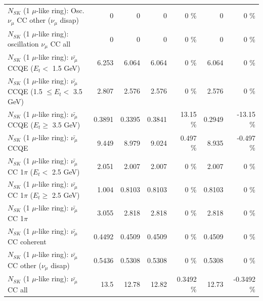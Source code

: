 \begin{table}
\begin{tabular}{| l | r | r | r  r | r  r |}
         $N_{SK}$ (1 $\mu$-like ring): Osc. $\nu_\mu$ CC other ($\nu_\mu$ disap) &               0 &               0 &               0 &        0 \%  &               0 &        0 \%  \\ 
                      $N_{SK}$ (1 $\mu$-like ring): oscillation $\nu_\mu$ CC all &               0 &               0 &               0 &        0 \%  &               0 &        0 \%  \\ 
\hline
\hline
          $N_{SK}$ (1 $\mu$-like ring): $\bar{\nu_\mu}$ CCQE ($E_{t} <$ 1.5 GeV) &           6.253 &           6.064 &           6.064 &        0 \%  &           6.064 &        0 \%  \\ 
 $N_{SK}$ (1 $\mu$-like ring): $\bar{\nu_\mu}$ CCQE (1.5 $\leq E_{t} <$ 3.5 GeV) &           2.807 &           2.576 &           2.576 &        0 \%  &           2.576 &        0 \%  \\ 
       $N_{SK}$ (1 $\mu$-like ring): $\bar{\nu_\mu}$ CCQE ($E_{t} \geq$ 3.5 GeV) &          0.3891 &          0.3395 &          0.3841 &    13.15 \%  &          0.2949 &   -13.15 \%  \\ 
\hline
                              $N_{SK}$ (1 $\mu$-like ring): $\bar{\nu_\mu}$ CCQE &           9.449 &           8.979 &           9.024 &    0.497 \%  &           8.935 &   -0.497 \%  \\ 
\hline
     $N_{SK}$ (1 $\mu$-like ring): $\bar{\nu_\mu}$ CC 1$\pi$ ($E_{t} <$ 2.5 GeV) &           2.051 &           2.007 &           2.007 &        0 \%  &           2.007 &        0 \%  \\ 
  $N_{SK}$ (1 $\mu$-like ring): $\bar{\nu_\mu}$ CC 1$\pi$ ($E_{t} \geq$ 2.5 GeV) &           1.004 &          0.8103 &          0.8103 &        0 \%  &          0.8103 &        0 \%  \\ 
\hline
                         $N_{SK}$ (1 $\mu$-like ring): $\bar{\nu_\mu}$ CC 1$\pi$ &           3.055 &           2.818 &           2.818 &        0 \%  &           2.818 &        0 \%  \\ 
                       $N_{SK}$ (1 $\mu$-like ring): $\bar{\nu_\mu}$ CC coherent &          0.4492 &          0.4509 &          0.4509 &        0 \%  &          0.4509 &        0 \%  \\ 
        $N_{SK}$ (1 $\mu$-like ring): $\bar{\nu_\mu}$ CC other ($\nu_\mu$ disap) &          0.5436 &          0.5308 &          0.5308 &        0 \%  &          0.5308 &        0 \%  \\ 
                          $N_{SK}$ (1 $\mu$-like ring): $\bar{\nu_{\mu}}$ CC all &            13.5 &           12.78 &           12.82 &   0.3492 \%  &           12.73 &  -0.3492 \%  \\ 

\end{tabular}
\end{table}

